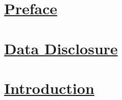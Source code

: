 \newpage
\renewcommand{\contentsname}{\centering\huge\textbf{\underline{Table of Contents}}}

\begin{center}
\tableofcontents
\end{center}

\newpage
\setcounter{page}{1}

\section{\underline{Preface}}





\newpage
\section{\underline{Data Disclosure}}




\newpage
\section{\underline{Introduction}}




\newpage



\newpage



